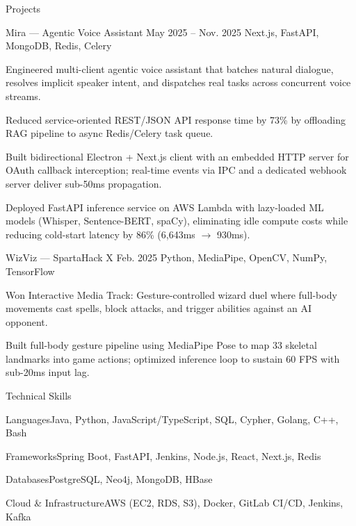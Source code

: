 \documentclass[
	11pt
]{../../../resume}
\begin{document}
	\begin{rSection}{P}{rojects}
		\begin{rSectionEntry}
			{Mira --- Agentic Voice Assistant}
			{May 2025 -- Nov. 2025}
			{}
			{Next.js, FastAPI, MongoDB, Redis, Celery}
			{}

			\item Engineered multi-client agentic voice assistant that batches natural dialogue, resolves implicit speaker intent, and dispatches real tasks across concurrent voice streams.
			\item Reduced service-oriented REST/JSON API response time by 73\% by offloading RAG pipeline to async Redis/Celery task queue.
			\item Built bidirectional Electron + Next.js client with an embedded HTTP server for OAuth callback interception; real-time events via IPC and a dedicated webhook server deliver sub-50ms propagation.
			\item Deployed FastAPI inference service on AWS Lambda with lazy-loaded ML models (Whisper, Sentence-BERT, spaCy), eliminating idle compute costs while reducing cold-start latency by 86\% (6{,}643ms $\rightarrow$ 930ms).
		\end{rSectionEntry}

		\begin{rSectionEntry}
			{WizViz --- SpartaHack X}
			{Feb. 2025}
			{}
			{Python, MediaPipe, OpenCV, NumPy, TensorFlow}
			{}

			\item Won Interactive Media Track: Gesture-controlled wizard duel where full-body movements cast spells, block attacks, and trigger abilities against an AI opponent.
			\item Built full-body gesture pipeline using MediaPipe Pose to map 33 skeletal landmarks into game actions; optimized inference loop to sustain 60 FPS with sub-20ms input lag.
		\end{rSectionEntry}
	\end{rSection}

	\begin{rSection}{T}{echnical Skills}
		\begin{rSet}{Languages}{Java, Python, JavaScript/TypeScript, SQL, Cypher, Golang, C++, Bash}
		\end{rSet}
		\begin{rSet}{Frameworks}{Spring Boot, FastAPI, Jenkins, Node.js, React, Next.js, Redis}
		\end{rSet}
		\begin{rSet}{Databases}{PostgreSQL, Neo4j, MongoDB, HBase}
		\end{rSet}
		\begin{rSet}{Cloud \& Infrastructure}{AWS (EC2, RDS, S3), Docker, GitLab CI/CD, Jenkins, Kafka}
		\end{rSet}
	\end{rSection}
\end{document}
